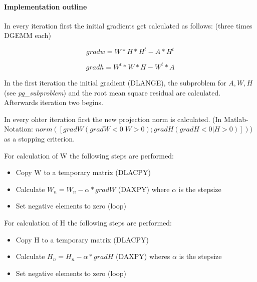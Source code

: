 \documentclass[a4paper,10pt]{scrartcl}
\begin{document}
			\paragraph{Implementation outline}


					In every iteration first the initial gradients get calculated as 
					follows: (three times DGEMM each)\newline

					\begin{equation*}
						gradw = W * H * H^t - A * H^t
					\end{equation*}
					
					\begin{equation*}
						gradh = W^t * W * H - W^t * A
					\end{equation*}

					In the first iteration the initial gradient (DLANGE), the subproblem
					for $A, W, H$ (see \emph{pg\_subproblem}) and the root mean square
					residual are calculated.\newline
					Afterwards iteration two begins.\newline

					In every ohter iteration first the new projection norm is calculated. (In 
					Matlab-Notation: $norm([gradW(gradW <0 | W > 0); gradH(gradH <0 | H > 
					0)])$) as a stopping criterion.\newline

					For calculation of W the following steps are performed:\newline

					\begin{itemize}
					 \item Copy W to a temporary matrix (DLACPY)\newline
					 \item Calculate $W_n = W_n -\alpha * gradW$ (DAXPY) where $\alpha$ is the 
						stepsize\newline
					 \item Set negative elements to zero (loop)\newline
					\end{itemize}


					For calculation of H the following steps are performed:\newline
					
					\begin{itemize}
					 \item Copy H to a temporary matrix (DLACPY)\newline
					 \item Calculate $H_n = H_n -\alpha * gradH$ (DAXPY) wheres $\alpha$ is 
						the stepsize\newline
					 \item Set negative elements to zero (loop)\newline
					\end{itemize}
\end{document}
